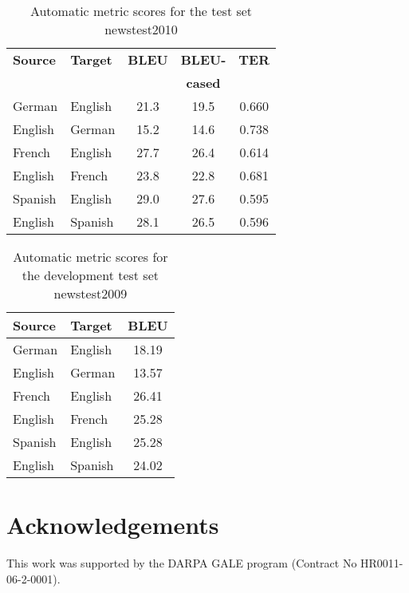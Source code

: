 \documentclass[11pt]{article}
\begin{document}
\begin{table}[h]
\begin{center}
\begin{tabular}{|l|l||c|c|c|}
\hline
\bf Source & \bf Target & \bf BLEU & \bf BLEU- & \bf TER \\
& & & \bf cased & \\
\hline
German & English & 21.3 & 19.5 & 0.660 \\ \hline
English & German & 15.2  & 14.6  & 0.738 \\ \hline
French & English & 27.7 & 26.4 & 0.614 \\ \hline
English & French & 23.8 & 22.8 & 0.681 \\ \hline
Spanish & English & 29.0 & 27.6 & 0.595 \\ \hline
English & Spanish & 28.1 & 26.5 & 0.596  \\ \hline
\end{tabular}
\end{center}
\caption{\label{scores} Automatic metric scores for the test set newstest2010 }
\end{table}


\begin{table}[h]
\begin{center}
\begin{tabular}{|l|l||c|}
\hline
\bf Source & \bf Target & \bf BLEU  \\
\hline
German & English & 18.19  \\ \hline
English & German & 13.57 \\ \hline
French & English & 26.41 \\ \hline
English & French & 25.28 \\ \hline
Spanish & English & 25.28 \\ \hline
English & Spanish & 24.02  \\ \hline
\end{tabular}
\end{center}
\caption{\label{devtest-scores} Automatic metric scores for the development test set newstest2009}
\end{table}


\section*{Acknowledgements}
This work was supported by the DARPA GALE program (Contract No HR0011-06-2-0001).



\end{document}
